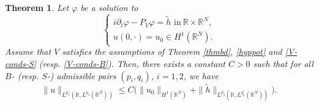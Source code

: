 \documentclass[10pt,leqno]{amsart}
\newtheorem{thm}{Theorem}[section]
\numberwithin{equation}{section}
\newcommand{\field}[1]{\mathbb{#1}}
\newcommand{\R}{\field{R}}          		%
\begin{document}
\begin{thm}
Let $\varphi$ be a solution to
$$\begin{cases}
i\partial_t \varphi- P_V  \varphi =\tilde{h}\mbox{ in}\ \R \times \R^N ,\\
u(0,\cdot)=u_0 \in H^1 (\R^N).
\end{cases}$$
Assume that $V$ satisfies the assumptions of Theorem \ref{thmbd}, \eqref{hyppot} and \eqref{V-conds-S} (resp. \eqref{V-conds-B}). Then, there exists a constant $C>0$ such that for all $B$- (resp. $S$-) admissible pairs $(p_i,q_i)$, $i=1,2$,
 we have
$$\|u\|_{L^{p_1}(\R,L^{q_1} (\R^N))} \leq C \big(\|u_0\|_{H^1 (\R^N)} +\|\tilde{h}\|_{L^{p_2^\prime} (\R , L^{q_2^\prime} (\R^N))}\big).$$
\end{thm}
\end{document}
